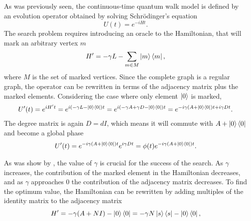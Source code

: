 \documentclass[../../dissertation.tex]{subfiles}
\begin{document}
As was previously seen, the continuous-time quantum walk model is defined by an
evolution operator obtained by solving Schrödinger's equation
\begin{equation}
	U(t) = e^{-iHt}.
\end{equation}
The search problem requires introducing an oracle to the Hamiltonian, that will
mark an arbitrary vertex $m$ 
\begin{equation}
	H' = -\gamma L - \sum_{m \in M}\ket{m}\bra{m},
\end{equation}
where $M$ is the set of marked vertices. Since the complete graph is a regular graph, the operator can be rewritten in terms of the adjacency matrix plus the marked elements. Considering the case where only element $\ket{0}$ is marked,
\begin{equation}
	U'(t) = e^{iH't} = e^{i(-\gamma L - \ket{0}\bra{0})t} = e^{i(-\gamma A + \gamma D - \ket{0}\bra{0})t} = e^{-i\gamma(A+\ket{0}\bra{0})t + i\gamma D t}.
\end{equation}
The degree matrix is again $D=dI$, which means it will commute with $A+\ket{0}\bra{0}$ and become a global phase
\begin{equation}
	U'(t) = e^{-i\gamma(A+\ket{0}\bra{0})t}e^{i\gamma D t} = \phi(t)e^{-i\gamma(A+\ket{0}\bra{0})t}.
\end{equation}\par
As was show by \cite{childs2004}, the value of $\gamma$ is crucial for the
success of the search. As $\gamma$ increases, the contribution of the marked
element in the Hamiltonian decreases, and as $\gamma$ approaches $0$ the
contribution of the adjacency matrix decreases. To find the optimum value, the
Hamiltonian can be rewritten by adding multiples of the identity matrix to the
adjacency matrix 
\begin{equation}
	H' = -\gamma(A+NI) - \ket{0}\bra{0} = -\gamma N\ket{s}\bra{s} - \ket{0}\bra{0},
\end{equation}
\end{document}
